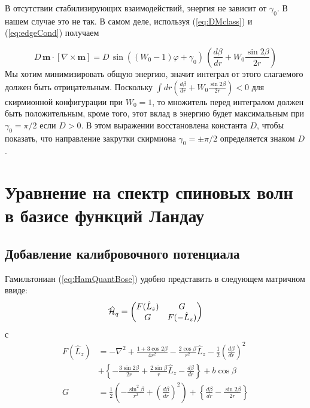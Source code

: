 \documentclass[a4paper,article,14pt]{extarticle}
\begin{document}
В отсутствии стабилизирующих взаимодействий, энергия не зависит от $\gamma_0$. В нашем случае это не так. В самом деле, используя (\ref{eq:DMclass}) и (\ref{eq:edgeCond}) получаем

\[D \, {\mathbf{m}} \cdot \left[ {\nabla  \times {\mathbf{m}}} \right] = D \, \sin \left( {\left( {{W_0} - 1} \right) \varphi  + {\gamma _0}} \right)\,\left( {\frac{{d\beta }}{{dr}} + {W_0}\frac{{\sin 2\beta }}{{2r}}} \right)\]
Мы хотим минимизировать общую энергию, значит интеграл от этого слагаемого должен быть отрицательным. Поскольку $\int {d{r}} \left( {\frac{{d\beta }}{{dr}} + {W_0}\frac{{\sin 2\beta }}{{2r}}} \right) < 0$ для скирмионной конфигурации  при $W_0=1$, то множитель перед интегралом должен быть положительным, кроме того, этот вклад в энергию будет максимальным при $\gamma_0 = \pi/2$ если $D>0$. В этом выражении восстановлена константа $D$, чтобы показать, что направление закрутки скирмиона $\gamma_0 = \pm \pi/2$ определяется знаком $D$.

\pagebreak
\section{ Уравнение на спектр спиновых волн в базисе функций Ландау }

\subsection{ Добавление калибровочного потенциала }

Гамильтониан (\ref{eq:HamQuantBose}) удобно представить в следующем матричном ввиде:
\begin{equation}
\hat {\cal H}_{q} =\begin{pmatrix} F(\hat  L_{z}) &G \\ G & F(  - \hat  L_{z} ) \end{pmatrix}
\end{equation}
с 
$$
\begin{aligned} 
F  (\hat  L_{z} )&=    - \nabla^{2}  + \frac{1 + 3\cos 2\beta }{4r^2} - \frac{2\cos \beta }{r^2}\hat{L}_{z} - \frac{1}{2}\left( \frac{d\beta }{dr} \right)^2  \\
& +  \left\{  - \frac{3\sin 2\beta }{2r} + \frac{2\sin \beta }{r}\hat{L}_{z}  - \frac{d\beta }{dr} \right\} + b\cos \beta   \\ 
G &= \frac{1}{2}\left(  - \frac{\sin ^2\beta }{r^2} + \left( \frac{d\beta }{dr} \right)^2 \right) 
+ \left\{ \frac{d\beta }{dr} - \frac{\sin 2\beta }{2r} \right\}
\end{aligned}  
$$
\end{document}
